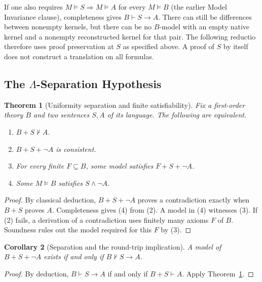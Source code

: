 \documentclass{article}
\newtheorem{theorem}{Theorem}[subsection]
\newtheorem{corollary}[theorem]{Corollary}
\theoremstyle{definition}
\begin{document}
If one also requires $M\models S\Rightarrow M\models A$ for every
$M\models B$ (the earlier Model Invariance clause), completeness gives
$B\vdash S\to A$. There can still be differences between nonempty
kernels, but there can be no $B$-model with an empty native kernel
and a nonempty reconstructed kernel for that pair. The following
reductio therefore uses proof preservation at $S$ as specified above.
A proof of $S$ by itself does not construct a translation on all formulas.

\subsection{The \texorpdfstring{$\Lambda$}{Lambda}-Separation Hypothesis}
\label{sec:separation}
\begin{theorem}[Uniformity separation and finite satisfiability]
\label{lem:uniformity-inexpressibility}\label{thm:uniformity-separation}
Fix a first-order theory $B$ and two sentences $S,A$ of its language.
The following are equivalent.
\begin{enumerate}
\item $B+S\nvdash A$.
\item $B+S+\neg A$ is consistent.
\item For every finite $F\subseteq B$, some model satisfies $F+S+\neg A$.
\item Some $M\models B$ satisfies $S\land\neg A$.
\end{enumerate}
\end{theorem}
\begin{proof}
By classical deduction, $B+S+\neg A$ proves a contradiction exactly
when $B+S$ proves $A$. Completeness gives (4) from (2).
A model in (4) witnesses (3). If (2) fails, a derivation of a
contradiction uses finitely many axioms $F$ of $B$. Soundness rules
out the model required for this $F$ by (3).
\end{proof}

\begin{corollary}[Separation and the round-trip implication]
\label{cor:lsh-bridge}
A model of $B+S+\neg A$ exists if and only if $B\nvdash S\to A$.
\end{corollary}
\begin{proof}
By deduction, $B\vdash S\to A$ if and only if $B+S\vdash A$.
Apply Theorem~\ref{lem:uniformity-inexpressibility}.
\end{proof}
\end{document}
